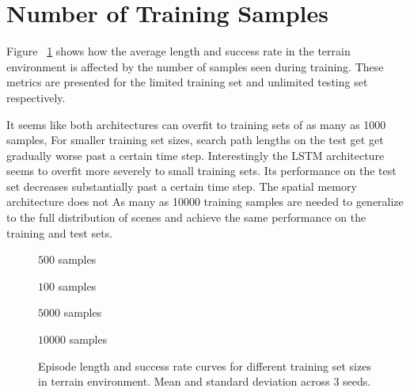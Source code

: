 \section{Number of Training Samples}

Figure ~\ref{fig:sample} shows how the average length and success rate in the terrain environment is affected by the number of samples seen during training.
These metrics are presented for the limited training set and unlimited testing set respectively.

It seems like both architectures can overfit to training sets of as many as 1000 samples,
For smaller training set sizes, search path lengths on the test get get gradually worse past a certain time step.
Interestingly the LSTM architecture seems to overfit more severely to small training sets.
Its performance on the test set decreases substantially past a certain time step.
The spatial memory architecture does not 
As many as 10000 training samples are needed to generalize to the full distribution of scenes and achieve the same performance on the training and test sets. 

\begin{figure}
    \centering
    \(500\) samples
    
    \(100\) samples
    
    \(5000\) samples
    
    \(10000\) samples
    
    \label{fig:sample}
    \caption[Learning curves for different number of training samples.]{Episode length and success rate curves for different training set sizes in terrain environment. Mean and standard deviation across 3 seeds.}
\end{figure}
